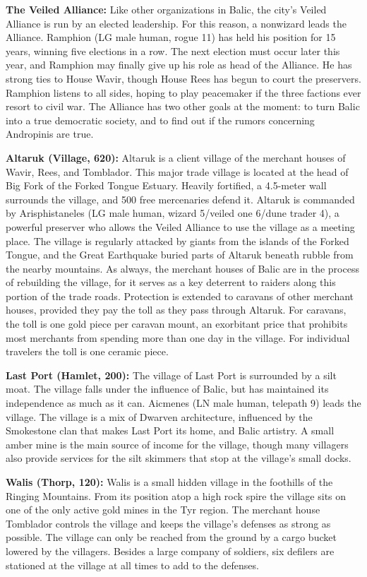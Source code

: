 {	\textbf{The Veiled Alliance:} Like other organizations in Balic, the city's Veiled Alliance is run by an elected leadership. For this reason, a nonwizard leads the Alliance. Ramphion (LG male human, rogue 11) has held his position for 15 years, winning five elections in a row. The next election must occur later this year, and Ramphion may finally give up his role as head of the Alliance. He has strong ties to House Wavir, though House Rees has begun to court the preservers. Ramphion listens to all sides, hoping to play peacemaker if the three factions ever resort to civil war. The Alliance has two other goals at the moment: to turn Balic into a true democratic society, and to find out if the rumors concerning Andropinis are true.
}
{
	\textbf{Altaruk (Village, 620):} Altaruk is a client village of the merchant houses of Wavir, Rees, and Tomblador. This major trade village is located at the head of Big Fork of the Forked Tongue Estuary. Heavily fortified, a 4.5-meter wall surrounds the village, and 500 free mercenaries defend it. Altaruk is commanded by Arisphistaneles (LG male human, wizard 5/veiled one 6/dune trader 4), a powerful preserver who allows the Veiled Alliance to use the village as a meeting place. The village is regularly attacked by giants from the islands of the Forked Tongue, and the Great Earthquake buried parts of Altaruk beneath rubble from the nearby mountains. As always, the merchant houses of Balic are in the process of rebuilding the village, for it serves as a key deterrent to raiders along this portion of the trade roads. Protection is extended to caravans of other merchant houses, provided they pay the toll as they pass through Altaruk. For caravans, the toll is one gold piece per caravan mount, an exorbitant price that prohibits most merchants from spending more than one day in the village. For individual travelers the toll is one ceramic piece.

	\textbf{Last Port (Hamlet, 200):} The village of Last Port is surrounded by a silt moat. The village falls under the influence of Balic, but has maintained its independence as much as it can. Aicmenes (LN male human, telepath 9) leads the village. The village is a mix of Dwarven architecture, influenced by the Smokestone clan that makes Last Port its home, and Balic artistry. A small amber mine is the main source of income for the village, though many villagers also provide services for the silt skimmers that stop at the village's small docks.

	\textbf{Walis (Thorp, 120):} Walis is a small hidden village in the foothills of the Ringing Mountains. From its position atop a high rock spire the village sits on one of the only active gold mines in the Tyr region. The merchant house Tomblador controls the village and keeps the village's defenses as strong as possible. The village can only be reached from the ground by a cargo bucket lowered by the villagers. Besides a large company of soldiers, six defilers are stationed at the village at all times to add to the defenses.
}

